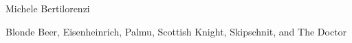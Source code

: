 


Michele Bertilorenzi


Blonde Beer, Eisenheinrich, Palmu, Scottish Knight, Skipschnit, and The Doctor
